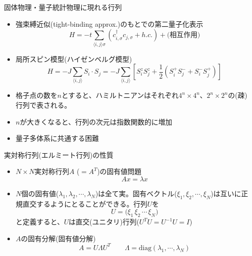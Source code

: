 \begin{frame}[t,fragile]{固体物理・量子統計物理に現れる行列}
  \begin{itemize}
  \item 強束縛近似(tight-binding approx.)のもとでの第二量子化表示
    \[
    H = -t \sum_{\langle i,j \rangle \sigma} (c_{i,\sigma}^\dagger c_{j,\sigma} + h.c.) + \text{(相互作用)}
    \]
  \item 局所スピン模型(ハイゼンベルグ模型)
    \[
    H = -J\sum_{\langle i,j \rangle} S_i \cdot S_j
    = -J\sum_{\langle i,j \rangle} [S_i^z S_j^z +\frac{1}{2} (S_i^+ S_j^- + S_i^- S_j^+) ]
    \]
  \item 格子点の数を$n$とすると、ハミルトニアンはそれぞれ$4^n \times 4^n$、$2^n \times 2^n$の(疎)行列で表される。
  \item $n$が大きくなると、行列の次元は指数関数的に増加
  \item 量子多体系に共通する困難
  \end{itemize}
\end{frame}

\begin{frame}[t,fragile]{実対称行列(エルミート行列)の性質}
  \begin{itemize}
  \item $N \times N$実対称行列$A$ ($=A^T$)の固有値問題
    \[
    A x = \lambda x
    \]
  \item $N$個の固有値($\lambda_1,\lambda_2,\cdots,\lambda_N$)は全て実。固有ベクトル($\xi_1,\xi_2,\cdots,\xi_N$)は互いに正規直交するようにとることができる。行列$U$を
    \[
    U = \Big( \xi_1 \, \xi_2 \, \cdots \, \xi_N \Big)
    \]
    と定義すると、$U$は直交(ユニタリ)行列($U^T U = U^{-1} U = I$)
  \item $A$の固有分解(固有値分解)
    \[
    A = U \Lambda U^T \qquad \Lambda = \text{diag}(\lambda_1,\cdots,\lambda_N)
    \]
  \end{itemize}
\end{frame}

